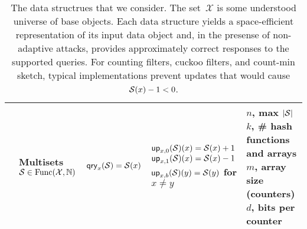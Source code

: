 \begin{table}[t]
\begin{center}
\begin{tabular}{ |p{1.75cm} | p{2.5cm} | p{2.95cm} | p{4cm} | p{3.7cm}|}
          & \parbox[c]{2.5cm}{Multisets\\ $\mathcal{S} \in \mathrm{Func}(\mathcal{X},\mathbb{N})$}
          & $\mathsf{qry}_x(\mathcal{S}) = \mathcal{S}(x)$
          & \parbox[c][10ex]{4cm}{$\mathsf{up}_{x,0}(\mathcal{S})(x) = \mathcal{S}(x)+1$ \\ $\mathsf{up}_{x,1}(\mathcal{S})(x) = \mathcal{S}(x)-1$ \\ $\mathsf{up}_{x,b}(\mathcal{S})(y) = \mathcal{S}(y)$ for $x \neq y$}
          & \parbox[c]{3.75cm}{$n$, max $|\mathcal{S}|$\\$k$, \# hash functions and arrays\\$m$, array size (counters)\\$d$, bits per counter}
          \\ \hline
  \end{tabular}
\caption{The data structrues that we consider.  The set~$\mathcal{X}$ is some understood universe of base objects.  Each data structure yields a space-efficient representation of its input data object and, in the presense of non-adaptive attacks, provides approximately correct responses to the supported queries.  For counting filters, cuckoo filters, and count-min sketch, typical implementations prevent updates that would cause $\mathcal{S}(x)-1 < 0$.}
\end{center}
\end{table}
